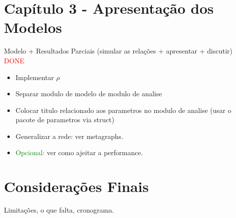 \documentclass{article}
\begin{document}
\section*{Capítulo 3 - Apresentação dos Modelos}

Modelo + Resultados Parciais (simular as relações + apresentar + discutir)
\textcolor{red}{DONE}



\begin{itemize}
\item Implementar $\rho$
\item Separar modulo de modelo de modulo de analise
\item Colocar titulo relacionado aos parametros no modulo de analise (usar o
  pacote de parametros via struct)
\item Generalizar a rede: ver metagraphs.
\item \textcolor{green}{Opcional:} ver como ajeitar a performance.
\end{itemize}




\section*{Considerações Finais}

Limitações, o que falta, cronograma.
\end{document}
